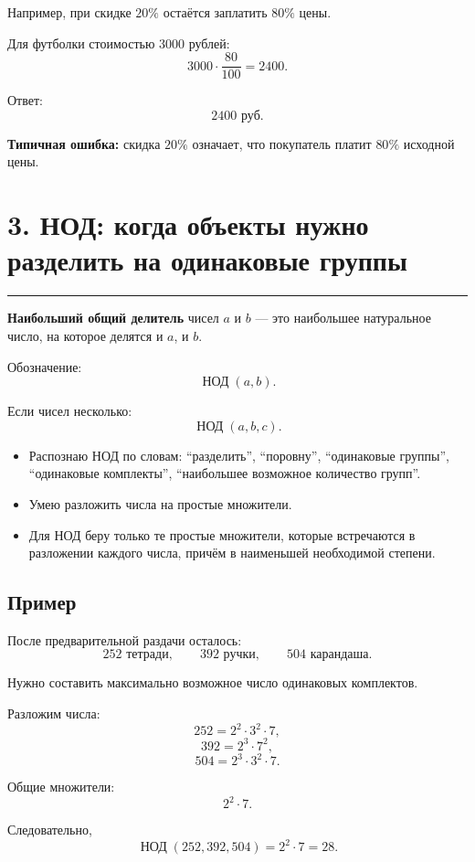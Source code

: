 \documentclass[a4paper,12pt]{article}
\newcommand{\sectionline}{%
    \par\vspace{2mm}
    {\color{accent}\rule{\linewidth}{0.7pt}}
    \vspace{2mm}
}
\newcommand{\checkitem}[1]{%
    \item[\textcolor{accent}{$\square$}] #1
}
\begin{document}
Например, при скидке \(20\%\) остаётся заплатить \(80\%\) цены.

Для футболки стоимостью \(3000\) рублей:
\[
    3000\cdot\frac{80}{100}=2400.
\]

Ответ:
\[
    \boxed{2400\text{ руб.}}
\]

\textbf{Типичная ошибка:}
скидка \(20\%\) означает, что покупатель платит \(80\%\) исходной цены.

\section*{\color{darkaccent}3. НОД: когда объекты нужно разделить на одинаковые группы}
\sectionline

\textbf{Наибольший общий делитель} чисел \(a\) и \(b\) --- это наибольшее натуральное число, на которое делятся и \(a\), и \(b\).

Обозначение:
\[
    \operatorname{НОД}(a,b).
\]

Если чисел несколько:
\[
    \operatorname{НОД}(a,b,c).
\]

\begin{itemize}
    \checkitem{Распознаю НОД по словам: ``разделить'', ``поровну'', ``одинаковые группы'', ``одинаковые комплекты'', ``наибольшее возможное количество групп''.}

    \checkitem{Умею разложить числа на простые множители.}

    \checkitem{Для НОД беру только те простые множители, которые встречаются в разложении каждого числа, причём в наименьшей необходимой степени.}
\end{itemize}

\subsection*{Пример}

После предварительной раздачи осталось:
\[
    252\text{ тетради},\qquad
    392\text{ ручки},\qquad
    504\text{ карандаша}.
\]

Нужно составить максимально возможное число одинаковых комплектов.

Разложим числа:
\[
    252=2^2\cdot3^2\cdot7,
\]
\[
    392=2^3\cdot7^2,
\]
\[
    504=2^3\cdot3^2\cdot7.
\]

Общие множители:
\[
    2^2\cdot7.
\]

Следовательно,
\[
    \operatorname{НОД}(252,392,504)
    =
    2^2\cdot7
    =
    28.
\]
\end{document}
